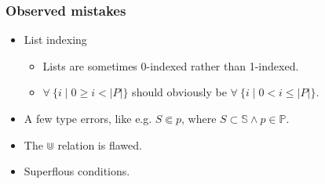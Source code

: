 \begin{frame}

\frametitle{Observed mistakes}

\begin{itemize}

\item List indexing

\begin{itemize}

\item \bi Lists are sometimes 0-indexed rather than 1-indexed.

\item \bi $\forall\ \{i\mid 0\geq i < |P|\}$ should obviously be $\forall\
\{i\mid 0< i \leq |P|\}$.

\end{itemize}

\item A few type errors, like e.g. $S\Subset p$, where $S\subset\mathbb{S}
\wedge p\in\mathbb{P}$.

\item The $\Cup$ relation is flawed.

\item Superflous conditions.

\end{itemize}

\end{frame}
